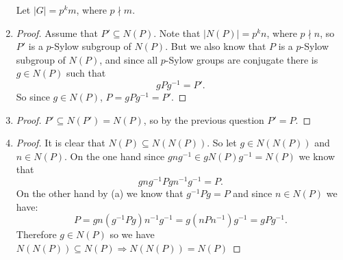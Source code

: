 \begin{exercise}
\begin{enumerate}[label = (\alph*)]
    Let $|G| = p^k m$, where  $p\nmid m$.
    \item 
    \begin{proof}
    Assume that $P'\subseteq N(P)$. Note that $|N(P)| = p^k n$, where $p\nmid n$, so $P'$ is a $p$-Sylow subgroup of $N(P)$. 
    But we also know that $P$ is a $p$-Sylow subgroup of $N(P)$, and since all $p$-Sylow groups are conjugate
    there is $g\in N(P)$ such that  \[
    gPg^{-1} = P'
.\]
So since $g\in N(P)$, $P = gPg^{-1} = P'$.
    \end{proof}
    \item
    \begin{proof}
    $P'\subseteq N(P') = N(P)$, so by the previous question  $P'= P$.
\end{proof}
\item 
\begin{proof}
  It is clear that $N(P)\subseteq N(N(P))$. So let $g\in N(N(P))$ and $n\in N(P)$.
  On the one hand since $gng^{-1}\in gN(P)g^{-1} = N(P)$ we know that \[
  gng^{-1}Pgn^{-1}g^{-1} = P
.\]
On the other hand by (a) we know that $g^{-1}Pg = P$ and since $n\in N(P)$ we have:  \[
    P = gn(g^{-1}Pg)n^{-1}g^{-1} = g(nPn^{-1})g^{-1} = gPg^{-1}
.\]
Therefore $g\in N(P)$ so we have  $N(N(P))\subseteq N(P) \Rightarrow N(N(P))= N(P)$
\end{proof}
\end{enumerate}
\end{exercise}

